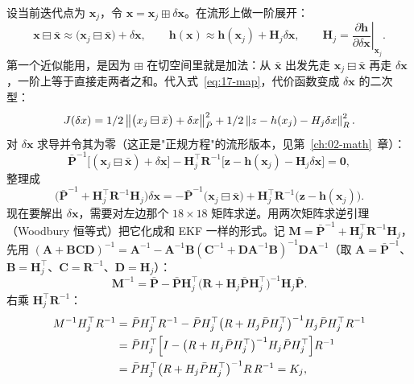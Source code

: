 设当前迭代点为 $\bm{x}_j$，令 $\bm{x}=\bm{x}_j\boxplus\delta\bm{x}$。在流形上做一阶展开：
\begin{equation}\label{eq:17-linearize}
  \bm{x}\boxminus\bar{\bm{x}}\approx\bigl(\bm{x}_j\boxminus\bar{\bm{x}}\bigr)+\delta\bm{x},\qquad
  \bm{h}(\bm{x})\approx\bm{h}(\bm{x}_j)+\bm{H}_j\delta\bm{x},\qquad
  \bm{H}_j=\left.\frac{\partial\bm{h}}{\partial\delta\bm{x}}\right|_{\bm{x}_j}.
\end{equation}
第一个近似能用，是因为 $\boxplus$ 在切空间里就是加法：从 $\bar{\bm{x}}$ 出发先走 $\bm{x}_j\boxminus\bar{\bm{x}}$ 再走 $\delta\bm{x}$，一阶上等于直接走两者之和。代入式~\eqref{eq:17-map}，代价函数变成 $\delta\bm{x}$ 的二次型：
\begin{equation}
  J(\delta x)=1/2\left\lVert \bigl(x_j\boxminus\bar{x}\bigr)+\delta x \right\rVert^{2}_{\bar{P}}
  +1/2\left\lVert z-h(x_j)-H_j\delta x \right\rVert^{2}_{R}.
\end{equation}
对 $\delta\bm{x}$ 求导并令其为零（这正是"正规方程"的流形版本，见第~\ref{ch:02-math}~章）：
\begin{equation}
  \bar{\bm{P}}^{-1}\bigl[(\bm{x}_j\boxminus\bar{\bm{x}})+\delta\bm{x}\bigr]
  -\bm{H}_j^{\top}\bm{R}^{-1}\bigl[\bm{z}-\bm{h}(\bm{x}_j)-\bm{H}_j\delta\bm{x}\bigr]=\bm{0},
\end{equation}
整理成
\begin{equation}\label{eq:17-normal}
  \bigl(\bar{\bm{P}}^{-1}+\bm{H}_j^{\top}\bm{R}^{-1}\bm{H}_j\bigr)\delta\bm{x}
  =-\bar{\bm{P}}^{-1}\bigl(\bm{x}_j\boxminus\bar{\bm{x}}\bigr)+\bm{H}_j^{\top}\bm{R}^{-1}\bigl(\bm{z}-\bm{h}(\bm{x}_j)\bigr).
\end{equation}
现在要解出 $\delta\bm{x}$，需要对左边那个 $18\times18$ 矩阵求逆。用两次矩阵求逆引理（Woodbury 恒等式）把它化成和 EKF 一样的形式。记 $\bm{M}=\bar{\bm{P}}^{-1}+\bm{H}_j^{\top}\bm{R}^{-1}\bm{H}_j$，先用 $(\bm{A}+\bm{BCD})^{-1}=\bm{A}^{-1}-\bm{A}^{-1}\bm{B}(\bm{C}^{-1}+\bm{DA}^{-1}\bm{B})^{-1}\bm{DA}^{-1}$（取 $\bm{A}=\bar{\bm{P}}^{-1}$、$\bm{B}=\bm{H}_j^{\top}$、$\bm{C}=\bm{R}^{-1}$、$\bm{D}=\bm{H}_j$）：
\begin{equation}
  \bm{M}^{-1}=\bar{\bm{P}}-\bar{\bm{P}}\bm{H}_j^{\top}\bigl(\bm{R}+\bm{H}_j\bar{\bm{P}}\bm{H}_j^{\top}\bigr)^{-1}\bm{H}_j\bar{\bm{P}}.
\end{equation}
右乘 $\bm{H}_j^{\top}\bm{R}^{-1}$：
\begin{align}
  M^{-1}H_j^{\top}R^{-1}
  &=\bar{P}H_j^{\top}R^{-1}-\bar{P}H_j^{\top}\bigl(R+H_j\bar{P}H_j^{\top}\bigr)^{-1}H_j\bar{P}H_j^{\top}R^{-1}\nonumber\\
  &=\bar{P}H_j^{\top}\Bigl[I-\bigl(R+H_j\bar{P}H_j^{\top}\bigr)^{-1}H_j\bar{P}H_j^{\top}\Bigr]R^{-1}\nonumber\\
  &=\bar{P}H_j^{\top}\bigl(R+H_j\bar{P}H_j^{\top}\bigr)^{-1}R\,R^{-1}
  =K_j,
\end{align}

